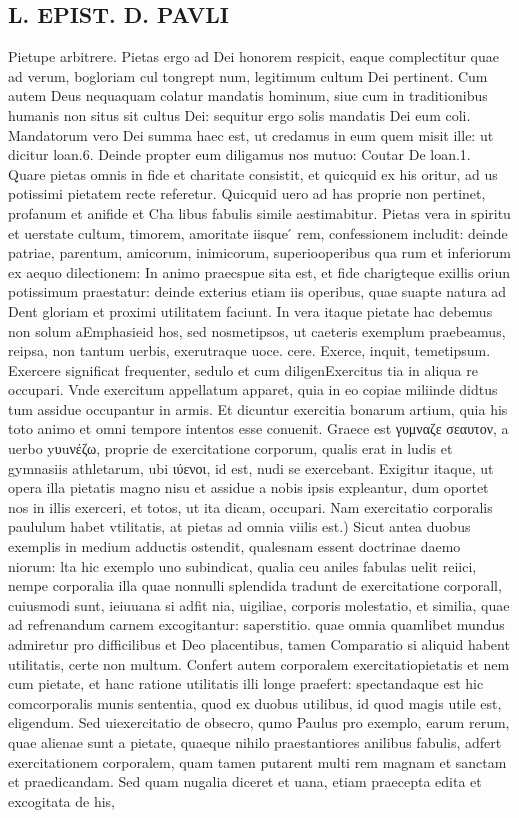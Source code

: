\documentclass{article}
\begin{document}
\begin{pages}
\section*{L. EPIST. D. PAVLI }
\marginpar{[ p.97 ]}\pstart Pietupe arbitrere. Pietas ergo ad Dei honorem respicit, eaque complectitur quae ad verum, bogloriam cul tongrept num, legitimum cultum Dei pertinent. Cum autem Deus nequaquam colatur mandatis hominum, siue cum in traditionibus humanis non situs sit cultus Dei: sequitur ergo solis mandatis Dei eum coli. Mandatorum vero Dei summa haec est, ut credamus in eum quem misit ille: ut dicitur loan.6. Deinde propter eum diligamus nos mutuo: Coutar De loan.1. Quare pietas omnis in fide et charitate consistit, et quicquid ex his oritur, ad us potissimi pietatem recte referetur. Quicquid uero ad has proprie non pertinet, profanum et anifide et Cha libus fabulis simile aestimabitur. Pietas vera in spiritu et uerstate cultum, timorem, amoritate iisque ́ rem, confessionem includit: deinde patriae, parentum, amicorum, inimicorum, superiooperibus qua rum et inferiorum ex aequo dilectionem: In animo praecspue sita est, et fide charigteque  exillis oriun potissimum praestatur: deinde exterius etiam iis operibus, quae suapte natura ad Dent gloriam et proximi utilitatem faciunt. In vera itaque pietate hac debemus non solum aEmphasieid hos, sed nosmetipsos, ut caeteris exemplum praebeamus, reipsa, non tantum uerbis, exerutraque uoce. cere. Exerce, inquit, temetipsum. Exercere significat frequenter, sedulo et cum diligenExercitus tia in aliqua re occupari. Vnde exercitum appellatum apparet, quia in eo copiae miliinde didtus tum assidue occupantur in armis. Et dicuntur exercitia bonarum artium, quia his toto animo et omni tempore intentos esse conuenit. Graece est γυμναζε σεαυτον, a uerbo yυuνέζω, proprie de exercitatione corporum, qualis erat in ludis et gymnasiis athletarum, ubi ιύενοι, id est, nudi se exercebant. Exigitur itaque, ut opera illa pietatis magno nisu et assidue a nobis ipsis expleantur, dum oportet nos in illis exerceri, et totos, ut ita dicam, occupari.  \pend\pstart Nam exercitatio corporalis paululum habet vtilitatis, at pietas ad omnia viilis est.) Sicut antea duobus exemplis in medium adductis ostendit, qualesnam essent doctrinae daemo niorum: lta hic exemplo uno subindicat, qualia ceu aniles fabulas uelit reiici, nempe corporalia illa quae nonnulli splendida tradunt de exercitatione corporall, cuiusmodi sunt, ieiuuana si adfit nia, uigiliae, corporis molestatio, et similia, quae ad refrenandum carnem excogitantur: saperstitio. quae omnia quamlibet mundus admiretur pro difficilibus et Deo placentibus, tamen Comparatio si aliquid habent utilitatis, certe non multum. Confert autem corporalem exercitatiopietatis et nem cum pietate, et hanc ratione utilitatis illi longe praefert: spectandaque est hic comcorporalis munis sententia, quod ex duobus utilibus, id quod magis utile est, eligendum. Sed uiexercitatio de obsecro, qumo Paulus pro exemplo, earum rerum, quae alienae sunt a pietate, quaeque  nihilo praestantiores anilibus fabulis, adfert exercitationem corporalem, quam tamen putarent multi rem magnam et sanctam et praedicandam. Sed quam nugalia diceret et uana, etiam praecepta edita et excogitata de his, 
\end{pages}
\end{document}
